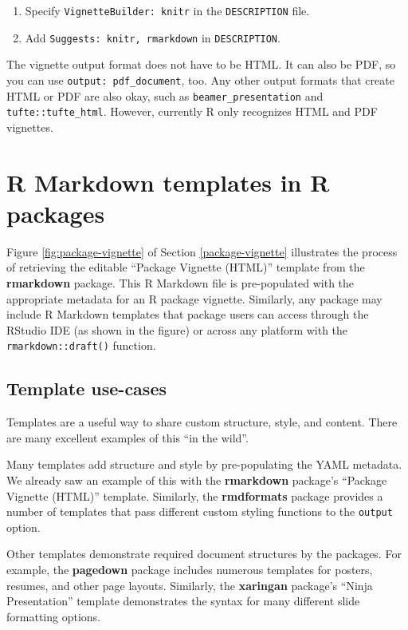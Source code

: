 \documentclass[
  11pt,
]{krantz}
\begin{document}
\begin{enumerate}
\def\labelenumi{\arabic{enumi}.}
\item
  Specify \texttt{VignetteBuilder:\ knitr} in the \texttt{DESCRIPTION} file.
\item
  Add \texttt{Suggests:\ knitr,\ rmarkdown} in \texttt{DESCRIPTION}.
\end{enumerate}

The vignette output format does not have to be HTML. It can also be PDF, so you can use \texttt{output:\ pdf\_document}, too. Any other output formats that create HTML or PDF are also okay, such as \texttt{beamer\_presentation} and \texttt{tufte::tufte\_html}. However, currently R only recognizes HTML and PDF vignettes.

\hypertarget{package-template}{%
\section{R Markdown templates in R packages}\label{package-template}}

Figure \ref{fig:package-vignette} of Section \ref{package-vignette} illustrates the process of retrieving the editable ``Package Vignette (HTML)'' template from the \textbf{rmarkdown} package. This R Markdown file is pre-populated with the appropriate metadata for an R package vignette. Similarly, any package may include R Markdown templates that package users can access through the RStudio IDE (as shown in the figure) or across any platform with the \texttt{rmarkdown::draft()} function.

\hypertarget{template-use-cases}{%
\subsection{Template use-cases}\label{template-use-cases}}

Templates are a useful way to share custom structure, style, and content. There are many excellent examples of this ``in the wild''.

Many templates add structure and style by pre-populating the YAML metadata. We already saw an example of this with the \textbf{rmarkdown} package's ``Package Vignette (HTML)'' template. Similarly, the \textbf{rmdformats} package provides a number of templates that pass different custom styling functions to the \texttt{output} option.

Other templates demonstrate required document structures by the packages. For example, the \textbf{pagedown} package includes numerous templates for posters, resumes, and other page layouts. Similarly, the \textbf{xaringan} package's ``Ninja Presentation'' template demonstrates the syntax for many different slide formatting options.
\end{document}
